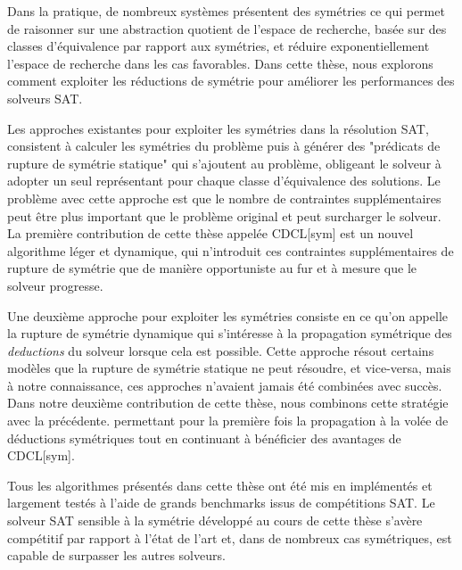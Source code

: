 Dans la pratique, de nombreux systèmes présentent des symétries ce qui permet de raisonner sur une abstraction quotient de l'espace de recherche, basée sur des classes d'équivalence par rapport aux symétries, et réduire exponentiellement l'espace de recherche dans les cas favorables.
Dans cette thèse, nous explorons comment exploiter les réductions de symétrie pour améliorer les performances des solveurs SAT.


Les approches existantes pour exploiter les symétries dans la résolution SAT, consistent à calculer les symétries du problème puis à générer des "prédicats de rupture de symétrie statique" qui s'ajoutent au problème, obligeant le solveur à adopter un seul représentant pour chaque classe d'équivalence des solutions.
Le problème avec cette approche est que le nombre de contraintes supplémentaires peut être plus important que le problème original et peut surcharger le solveur. La première contribution de cette thèse appelée CDCL[sym] est un nouvel algorithme léger et dynamique, qui n'introduit ces contraintes supplémentaires de rupture de symétrie que de manière opportuniste au fur et à mesure que le solveur progresse.

Une deuxième approche pour exploiter les symétries consiste en ce qu'on appelle la rupture de symétrie dynamique qui s'intéresse à la propagation symétrique des \textit{deductions} du solveur lorsque cela est possible.
Cette approche résout certains modèles que la rupture de symétrie statique ne peut résoudre, et vice-versa, mais à notre connaissance, ces approches n'avaient jamais été combinées avec succès. 
Dans notre deuxième contribution de cette thèse, nous combinons cette stratégie avec la précédente. permettant pour la première fois la propagation à la volée de déductions symétriques tout en continuant à bénéficier des avantages de CDCL[sym].

Tous les algorithmes présentés dans cette thèse ont été mis en implémentés et largement testés à l'aide de grands benchmarks issus de compétitions SAT. Le solveur SAT sensible à la symétrie développé au cours de cette thèse s'avère compétitif par rapport à l'état de l'art et, dans de nombreux cas symétriques, est capable de surpasser les autres solveurs.


